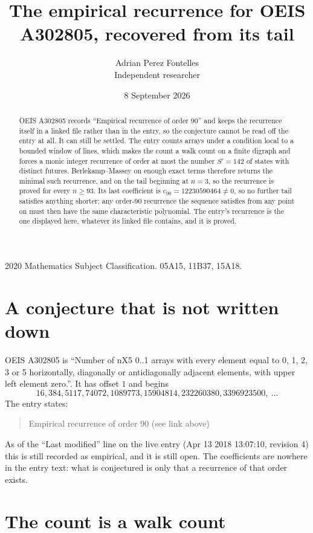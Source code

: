 \documentclass[11pt,a4paper]{article}
\title{The empirical recurrence for OEIS A302805, recovered from its tail}
\author{Adrian Perez Fontelles\\ \small Independent researcher}
\date{8 September 2026}
\theoremstyle{plain}
\theoremstyle{definition}
\begin{document}
\maketitle

\begin{abstract}
OEIS A302805 records ``Empirical recurrence of order $90$'' and keeps the recurrence itself in
a linked file rather than in the entry, so the conjecture cannot be read off the entry at all.
It can still be settled. The entry counts arrays under a condition local to a bounded window of
lines, which makes the count a walk count on a finite digraph and forces a monic integer
recurrence of order at most the number $S'=142$ of states with distinct futures. Berlekamp--Massey on
enough exact terms therefore returns the minimal such recurrence, and on the tail beginning at $n=3$, so the recurrence is proved for every $n\ge93$.
Its last coefficient is $c_{90}=12230590464\neq0$, so no further tail satisfies anything
shorter; any order-$90$ recurrence the sequence satisfies from any point on must then have
the same characteristic polynomial. The entry's recurrence is the one displayed here, whatever
its linked file contains, and it is proved.
\end{abstract}

\noindent\small 2020 Mathematics Subject Classification. 05A15, 11B37, 15A18.\normalsize

\section{A conjecture that is not written down}

OEIS A302805 is ``Number of nX5 0..1 arrays with every element equal to 0, 1, 2, 3 or 5 horizontally, diagonally or antidiagonally adjacent elements, with upper left element zero.''. It has offset $1$ and begins
\[
16, 384, 5117, 74072, 1089773, 15904814, 232260380, 3396923500,\ \dots
\]
The entry states:
\begin{quote}
Empirical recurrence of order 90 (see link above)
\end{quote}
As of the ``Last modified'' line on the live entry (Apr 13 2018 13:07:10, revision 4)
this is still recorded as empirical, and it is still open. The coefficients are nowhere in the
entry text: what is conjectured is only that a recurrence of that order exists.

\section{The count is a walk count}
\end{document}
